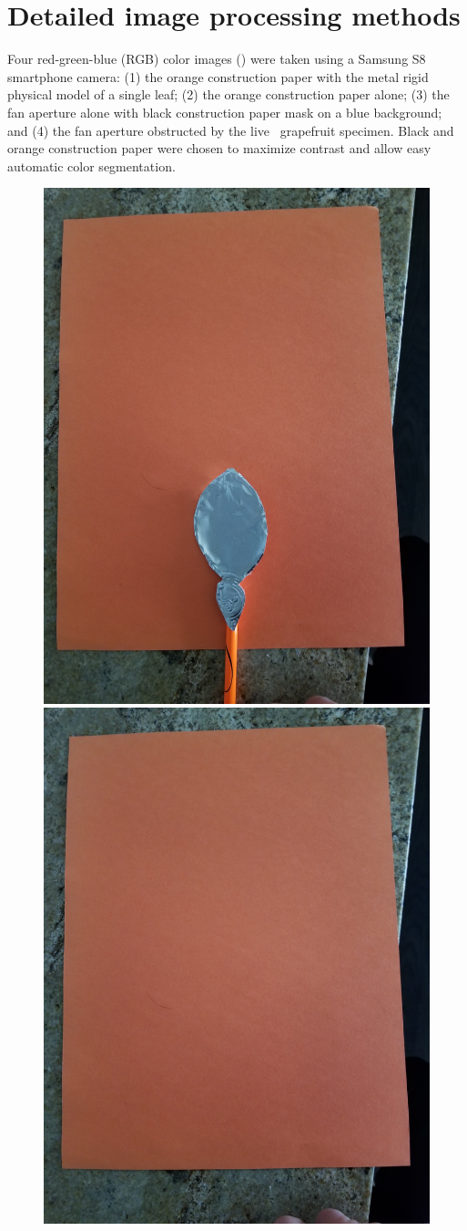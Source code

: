\section{Detailed image processing methods}
\label{sec:A}

Four red-green-blue (RGB) color images () were taken using a Samsung S8 smartphone camera: (1) the orange construction paper with the metal rigid physical model of a single leaf; (2) the orange construction paper alone; (3) the fan aperture alone with black construction paper mask on a blue background; and (4) the fan aperture obstructed by the live \Cxparadisi\ grapefruit specimen. Black and orange construction paper were chosen to maximize contrast and allow easy automatic color segmentation. 
\begin{figure}
\begin{center}
\includegraphics[width=0.49\columnwidth]{figures/MetalLeaf.jpg}
\includegraphics[width=0.49\columnwidth]{figures/Paper.jpg} \\

\end{center}
\end{figure}
